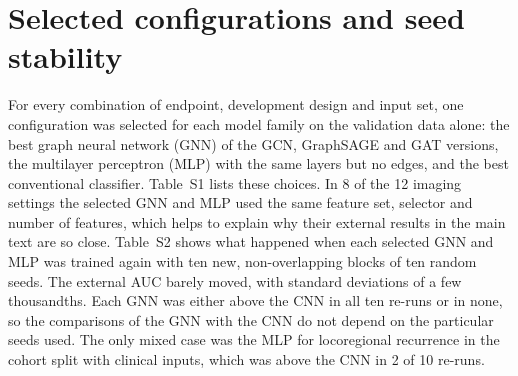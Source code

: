 \documentclass[10pt,a4paper]{article}
\begin{document}
\clearpage

\section*{Selected configurations and seed stability}
For every combination of endpoint, development design and input set, one configuration was selected for each model family on the validation data alone: the best graph neural network (GNN) of the GCN, GraphSAGE and GAT versions, the multilayer perceptron (MLP) with the same layers but no edges, and the best conventional classifier. Table~S1 lists these choices. In 8 of the 12 imaging settings the selected GNN and MLP used the same feature set, selector and number of features, which helps to explain why their external results in the main text are so close. Table~S2 shows what happened when each selected GNN and MLP was trained again with ten new, non-overlapping blocks of ten random seeds. The external AUC barely moved, with standard deviations of a few thousandths. Each GNN was either above the CNN in all ten re-runs or in none, so the comparisons of the GNN with the CNN do not depend on the particular seeds used. The only mixed case was the MLP for locoregional recurrence in the cohort split with clinical inputs, which was above the CNN in 2 of 10 re-runs.

\begin{table}[H]
\centering
\caption{Configurations chosen on validation for every endpoint, design and input set, separately for the GNN (best of GCN, GraphSAGE and GAT), the MLP without edges and the conventional classifier (logistic regression or random forest, RF)}\label{tab:configs}
\tabsetup\footnotesize

\end{table}

\begin{table}[H]
\centering
\caption{External AUC on HN1 of the chosen configurations when retrained with disjoint ten-seed ensembles (seeds from 1000 onwards)}\label{tab:seed}
\tabsetup

\end{table}

\clearpage
{\footnotesize
\setlength{\LTcapwidth}{\linewidth}
\renewcommand{\arraystretch}{1.15}

}
\end{document}
